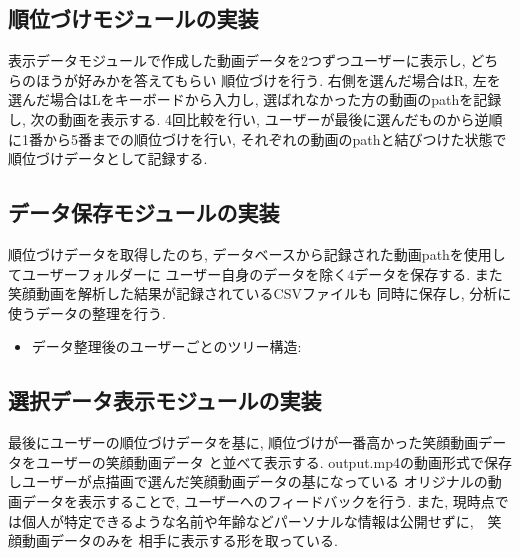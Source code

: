 \subsection{順位づけモジュールの実装}
表示データモジュールで作成した動画データを2つずつユーザーに表示し, どちらのほうが好みかを答えてもらい
順位づけを行う. 右側を選んだ場合はR, 左を選んだ場合はLをキーボードから入力し,
選ばれなかった方の動画のpathを記録し, 次の動画を表示する.
4回比較を行い, ユーザーが最後に選んだものから逆順に1番から5番までの順位づけを行い,
それぞれの動画のpathと結びつけた状態で順位づけデータとして記録する.

\subsection{データ保存モジュールの実装}
順位づけデータを取得したのち, データベースから記録された動画pathを使用してユーザーフォルダーに
ユーザー自身のデータを除く4データを保存する. また笑顔動画を解析した結果が記録されているCSVファイルも
同時に保存し, 分析に使うデータの整理を行う.

\begin{itemize}
\item データ整理後のユーザーごとのツリー構造:
\end{itemize}

\subsection{選択データ表示モジュールの実装}
最後にユーザーの順位づけデータを基に, 順位づけが一番高かった笑顔動画データをユーザーの笑顔動画データ
と並べて表示する. output.mp4の動画形式で保存しユーザーが点描画で選んだ笑顔動画データの基になっている
オリジナルの動画データを表示することで, ユーザーへのフィードバックを行う.
また, 現時点では個人が特定できるような名前や年齢などパーソナルな情報は公開せずに,　笑顔動画データのみを
相手に表示する形を取っている.

